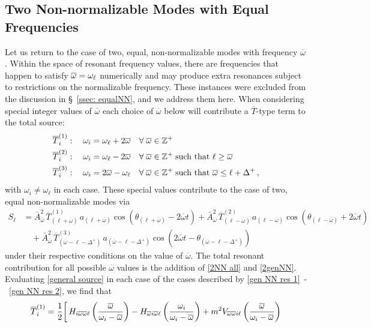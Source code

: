 \documentclass[../PhD.tex]{subfiles}
\newcommand{\ob}{\overline{\omega}}
\begin{document}
\begin{subappendices}
\section{Two Non-normalizable Modes with Equal Frequencies}
\label{more 2NN}
Let us return to the case of two, equal, non-normalizable modes with frequency $\ob$. Within the space of resonant frequency values, there are frequencies that happen to satisfy $\ob = \ol$ numerically and may produce extra resonances subject to restrictions on the normalizable frequency. These instances were excluded from the discussion in \S\!~\ref{ssec: equalNN}, and we address them here. When considering special integer values of $\ob$ each choice of $\ob$ below will contribute a $\overline T$-type term to the total source:
\begin{align}
\label{gen NN res 1}
\overline{T}^{(1)}_{i}: \quad \omega_i &= \ol + 2\ob \quad \forall \; \ob \in \mathbb{Z}^+ \\
\overline{T}^{(2)}_{i}: \quad \omega_i &= \ol - 2\ob \quad \forall \; \ob \in \mathbb{Z}^+ \; \text{such that } \ell \geq \ob \\
\label{gen NN res 2}
\overline{T}^{(3)}_{i}: \quad \omega_i &= 2\ob - \ol \quad \forall \; \ob \in \mathbb{Z}^+ \; \text{such that } \ob \leq \ell + \Delta^+ \, ,
\end{align}
with $\omega_i \neq \omega_\ell$ in each case. These special values contribute to the case of two, equal non-normalizable modes via
\begin{align}
\label{2NN all}
S_\ell &= \bar A^2_{\ob} \, \overline{T}^{(1)}_{(\ell + \ob)} \, a_{(\ell + \ob)} \cos \left( \theta_{(\ell + \ob)} - 2\ob t \right) + \bar A^2_{\ob} \, \overline{T}^{(2)}_{(\ell - \ob)} \, a_{(\ell - \ob)}\cos \left( \theta_{(\ell - \ob)} + 2\ob t \right) \nonumber \\
& \quad + \bar A^2_{\ob} \, \overline{T}^{(3)}_{(\ob - \ell - \Delta^+)} \, a_{(\ob - \ell- \Delta^+)} \cos \left( 2\ob t - \theta_{(\ob - \ell - \Delta^+)} \right) 
\end{align}
under their respective conditions on the value of $\ob$. The total resonant contribution for all possible $\ob$ values is the addition of \eqref{2NN all} and \eqref{2genNN}. 
Evaluating \eqref{general source} in each case of the cases described by \eqref{gen NN res 1}~\!-~\!\eqref{gen NN res 2}, we find that
\begin{align}
\overline{T}^{(1)}_{i} &= \frac{1}{2} \bigg[ \, H_{i\ob\ob\ell} \left( \frac{\ob}{\oi - \ob} \right) - H_{\ob i \ob\ell} \left( \frac{\oi}{\oi - \ob} \right) + m^2 V_{\ob\ob i\ell} \left( \frac{\ob}{\oi - \ob} \right) \nonumber \\

\end{align}
\end{subappendices}
\end{document}
